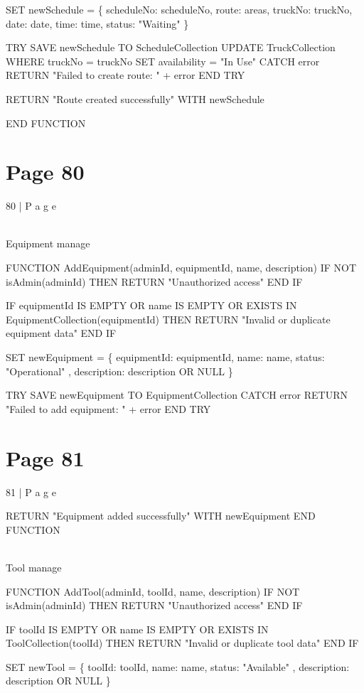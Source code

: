 \documentclass{article}
\begin{document}
SET newSchedule = \{ 
    scheduleNo: scheduleNo, 
    route: areas, 
    truckNo: truckNo, 
    date: date, 
    time: time, 
    status: "Waiting" 
\} 
 
TRY 
    SAVE newSchedule TO ScheduleCollection 
    UPDATE TruckCollection WHERE truckNo = truckNo SET availability = 
"In Use" 
CATCH error 
    RETURN "Failed to create route: " + error 
END TRY 
 
RETURN "Route created successfully" WITH newSchedule 
  
END FUNCTION 

\section*{Page 80}
80 | P a g e 
 
 
 
\\Equipment  manage 
 
 
FUNCTION AddEquipment(adminId, equipmentId, name, description) 
    IF NOT isAdmin(adminId) THEN 
        RETURN "Unauthorized access" 
    END IF 
  
    IF equipmentId IS EMPTY OR name IS EMPTY OR EXISTS IN 
EquipmentCollection(equipmentId) THEN 
        RETURN "Invalid or duplicate equipment data" 
    END IF 
  
    SET newEquipment = \{ 
        equipmentId: equipmentId, 
        name: name, 
        status: "Operational" , 
        description: description OR NULL 
    \} 
  
    TRY 
        SAVE newEquipment TO EquipmentCollection 
    CATCH error 
        RETURN "Failed to add equipment: " + error 
    END TRY 

\section*{Page 81}
81 | P a g e 
 
  
    RETURN "Equipment added successfully" WITH newEquipment 
END FUNCTION 
 
 
\\Tool manage 
 
 
FUNCTION AddTool(adminId, toolId, name, description) 
    IF NOT isAdmin(adminId) THEN 
        RETURN "Unauthorized access" 
    END IF 
  
    IF toolId IS EMPTY OR name IS EMPTY OR EXISTS IN ToolCollection(toolId) THEN 
        RETURN "Invalid or duplicate tool data" 
    END IF 
  
    SET newTool = \{ 
        toolId: toolId, 
        name: name, 
        status: "Available" , 
        description: description OR NULL 
    \} 
  
\end{document}
